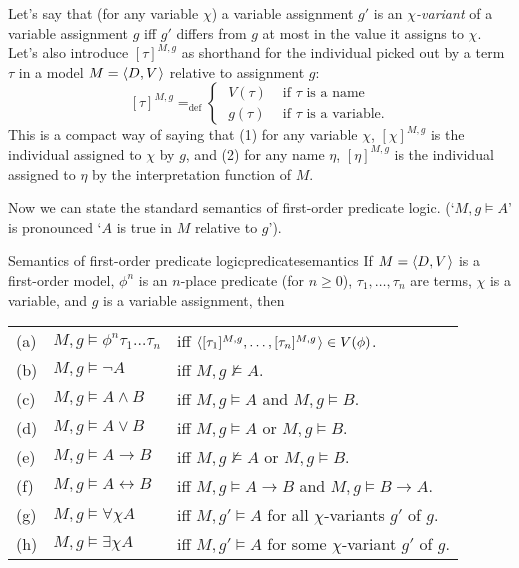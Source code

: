 Let's say that (for any variable $\chi$) a variable assignment $g'$ is an
\emph{$\chi$-variant} of a variable assignment $g$ iff $g'$ differs from $g$ at
most in the value it assigns to $\chi$. Let's also introduce $[\tau]^{M,g}$ as
shorthand for the individual picked out by a term $\tau$ in a model
$M = \t{D,V}$ relative to assignment $g$:
\[
  [\tau]^{M,g} =_\text{def} \begin{cases} \;V(\tau) & \text{ if $\tau$ is a name}\\
    \;g(\tau) & \text{ if $\tau$ is a variable}.
  \end{cases}
\]
This is a compact way of saying that (1) for any variable $\chi$, $[\chi]^{M,g}$
is the individual assigned to $\chi$ by $g$, and (2) for any name $\eta$,
$[\eta]^{M,g}$ is the individual assigned to $\eta$ by the interpretation function
of $M$.

Now we can state the standard semantics of first-order predicate logic.
(`$M,g \models A$' is pronounced `$A$ is true in $M$ relative to $g$').

\begin{definition}{Semantics of first-order predicate logic}{predicatesemantics}
  If $M = \t{D,V}$ is a first-order model, $\phi^{n}$ is an $n$-place predicate
  (for $n\geq 0$), $\tau_1,\ldots,\tau_n$ are terms, $\chi$ is a variable, and
  $g$ is a variable assignment, then
  
  \medskip
  \begin{tabular}{lll}
    (a) & $M,g \models \phi^{n} \tau_1\ldots \tau_n$ &iff $\t{[\tau_1]^{M,g},\ldots,[\tau_n]^{M,g}} \in V(\phi)$.\\
    (b) & $M,g \models \neg A$ &iff $M,g \not\models A$.\\
    (c) & $M,g \models A \land B$ &iff $M,g \models A$ and $M,g \models B$.\\
    (d) & $M,g \models A \lor B$ &iff $M,g \models A$ or $M,g \models B$.\\
    (e) & $M,g \models A \to B$ &iff $M,g \not\models A$ or $M,g \models B$.\\
    (f) & $M,g \models A \leftrightarrow B$ &iff $M,g \models A\to B$ and $M,g \models B\to A$.\\
    (g) & $M,g \models \forall \chi A$ &iff $M,g' \models A$ for all $\chi$-variants $g'$ of $g$.\\
    (h) & $M,g \models \exists \chi A$ &iff $M,g' \models A$ for some $\chi$-variant $g'$ of $g$.
  \end{tabular}
\end{definition}


